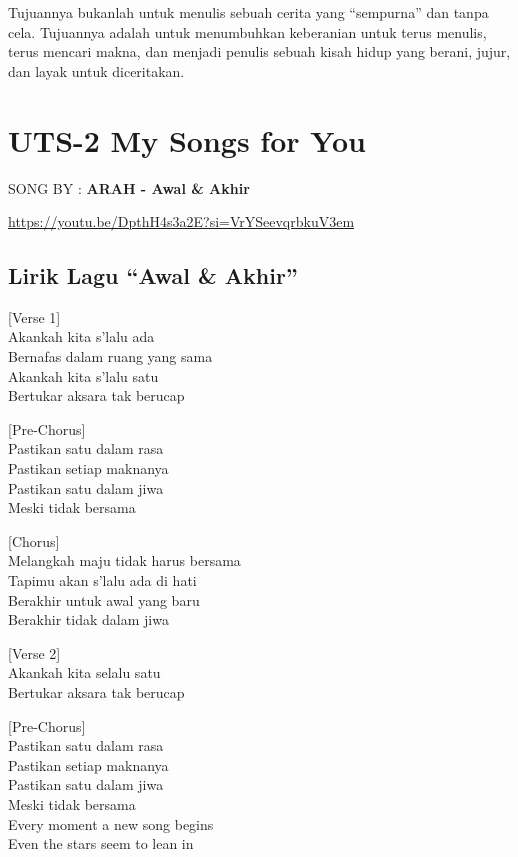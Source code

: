 \documentclass[
  letterpaper,
  DIV=11,
  numbers=noendperiod]{scrreprt}
\begin{document}
Tujuannya bukanlah untuk menulis sebuah cerita yang ``sempurna'' dan
tanpa cela. Tujuannya adalah untuk menumbuhkan keberanian untuk terus
menulis, terus mencari makna, dan menjadi penulis sebuah kisah hidup
yang berani, jujur, dan layak untuk diceritakan.


\chapter{UTS-2 My Songs for You}\label{uts-2-my-songs-for-you}

SONG BY : \textbf{ARAH - Awal \& Akhir}

\url{https://youtu.be/DpthH4s3a2E?si=VrYSeevqrbkuV3em}

\section{Lirik Lagu ``Awal \& Akhir''}\label{lirik-lagu-awal-akhir}

{[}Verse 1{]}\\
Akankah kita s'lalu ada\\
Bernafas dalam ruang yang sama\\
Akankah kita s'lalu satu\\
Bertukar aksara tak berucap

{[}Pre-Chorus{]}\\
Pastikan satu dalam rasa\\
Pastikan setiap maknanya\\
Pastikan satu dalam jiwa\\
Meski tidak bersama

{[}Chorus{]}\\
Melangkah maju tidak harus bersama\\
Tapimu akan s'lalu ada di hati\\
Berakhir untuk awal yang baru\\
Berakhir tidak dalam jiwa

{[}Verse 2{]}\\
Akankah kita selalu satu\\
Bertukar aksara tak berucap

{[}Pre-Chorus{]}\\
Pastikan satu dalam rasa\\
Pastikan setiap maknanya\\
Pastikan satu dalam jiwa\\
Meski tidak bersama\\
Every moment a new song begins\\
Even the stars seem to lean in
\end{document}
